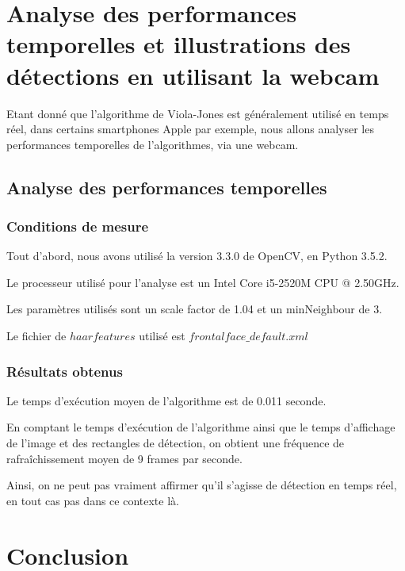 \documentclass[a4paper,11pt]{article}
\begin{document}
	

\section{Analyse des performances temporelles et illustrations des détections en utilisant la webcam}

Etant donné que l'algorithme de Viola-Jones est généralement utilisé en temps réel, dans certains smartphones Apple par exemple, nous allons analyser les performances temporelles de l'algorithmes, via une webcam.

\subsection{Analyse des performances temporelles}
\subsubsection{Conditions de mesure}

Tout d'abord, nous avons utilisé la version 3.3.0 de OpenCV, en Python 3.5.2.

Le processeur utilisé pour l'analyse est un Intel Core i5-2520M CPU @ 2.50GHz.

Les paramètres utilisés sont un scale factor de 1.04 et un minNeighbour de 3.

Le fichier de $haar features$ utilisé est $frontalface\_default.xml$

\subsubsection{Résultats obtenus}

Le temps d'exécution moyen de l'algorithme est de 0.011 seconde.

En comptant le temps d'exécution de l'algorithme ainsi que le temps d'affichage de l'image et des rectangles de détection, on obtient une fréquence de rafraîchissement moyen de 9 frames par seconde.

Ainsi, on ne peut pas vraiment affirmer qu'il s'agisse de détection en temps réel, en tout cas pas dans ce contexte là.

\section*{Conclusion}
    
\end{document}
